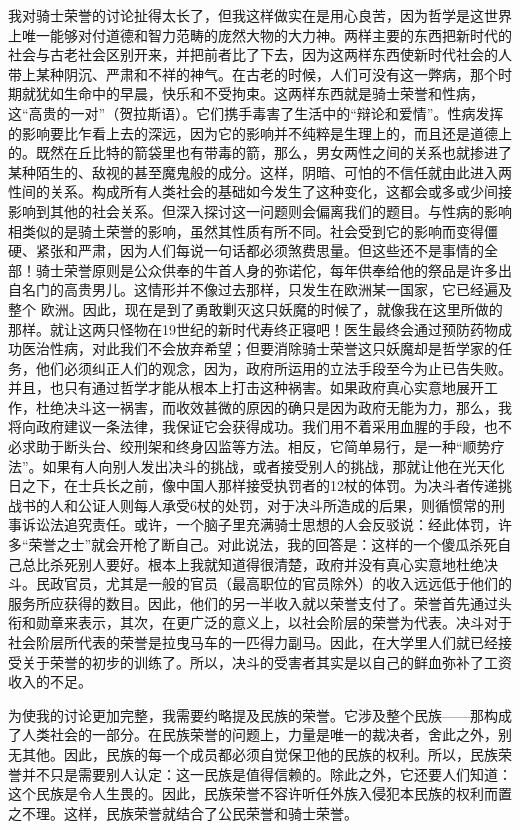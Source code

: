 \documentclass[12pt,oneside]{book}
\begin{document}
我对骑士荣誉的讨论扯得太长了，但我这样做实在是用心良苦，因为哲学是这世界上唯一能够对付道德和智力范畴的庞然大物的大力神。两样主要的东西把新时代的社会与古老社会区别开来，并把前者比了下去，因为这两样东西使新时代社会的人带上某种阴沉、严肃和不祥的神气。在古老的时候，人们可没有这一弊病，那个时期就犹如生命中的早晨，快乐和不受拘束。这两样东西就是骑士荣誉和性病，这“高贵的一对”（贺拉斯语）。它们携手毒害了生活中的“辩论和爱情”。性病发挥的影响要比乍看上去的深远，因为它的影响并不纯粹是生理上的，而且还是道德上的。既然在丘比特的箭袋里也有带毒的箭，那么，男女两性之间的关系也就掺进了某种陌生的、敌视的甚至魔鬼般的成分。这样，阴暗、可怕的不信任就由此进入两性间的关系。构成所有人类社会的基础如今发生了这种变化，这都会或多或少间接影响到其他的社会关系。但深入探讨这一问题则会偏离我们的题目。与性病的影响相类似的是骑土荣誉的影响，虽然其性质有所不同。社会受到它的影响而变得僵硬、紧张和严肃，因为人们每说一句话都必须煞费思量。但这些还不是事情的全部！骑士荣誉原则是公众供奉的牛首人身的弥诺佗，每年供奉给他的祭品是许多出自名门的高贵男儿。这情形并不像过去那样，只发生在欧洲某一国家，它已经遍及整个
欧洲。因此，现在是到了勇敢剿灭这只妖魔的时候了，就像我在这里所做的那样。就让这两只怪物在19世纪的新时代寿终正寝吧！医生最终会通过预防药物成功医治性病，对此我们不会放弃希望；但要消除骑士荣誉这只妖魔却是哲学家的任务，他们必须纠正人们的观念，因为，政府所运用的立法手段至今为止已告失败。并且，也只有通过哲学才能从根本上打击这种祸害。如果政府真心实意地展开工作，杜绝决斗这一祸害，而收效甚微的原因的确只是因为政府无能为力，那么，我将向政府建议一条法律，我保证它会获得成功。我们用不着采用血腥的手段，也不必求助于断头台、绞刑架和终身囚监等方法。相反，它简单易行，是一种“顺势疗法”。如果有人向别人发出决斗的挑战，或者接受别人的挑战，那就让他在光天化日之下，在士兵长之前，像中国人那样接受执罚者的12杖的体罚。为决斗者传递挑战书的人和公证人则每人承受6杖的处罚，对于决斗所造成的后果，则循惯常的刑事诉讼法追究责任。或许，一个脑子里充满骑士思想的人会反驳说：经此体罚，许多“荣誉之士”就会开枪了断自己。对此说法，我的回答是：这样的一个傻瓜杀死自己总比杀死别人要好。根本上我就知道得很清楚，政府并没有真心实意地杜绝决斗。民政官员，尤其是一般的官员（最高职位的官员除外）的收入远远低于他们的服务所应获得的数目。因此，他们的另一半收入就以荣誉支付了。荣誉首先通过头衔和勋章来表示，其次，在更广泛的意义上，以社会阶层的荣誉为代表。决斗对于社会阶层所代表的荣誉是拉曳马车的一匹得力副马。因此，在大学里人们就已经接受关于荣誉的初步的训练了。所以，决斗的受害者其实是以自己的鲜血弥补了工资收入的不足。 

为使我的讨论更加完整，我需要约略提及民族的荣誉。它涉及整个民族——那构成了人类社会的一部分。在民族荣誉的问题上，力量是唯一的裁决者，舍此之外，别无其他。因此，民族的每一个成员都必须自觉保卫他的民族的权利。所以，民族荣誉并不只是需要别人认定：这一民族是值得信赖的。除此之外，它还要人们知道：这个民族是令人生畏的。因此，民族荣誉不容许听任外族入侵犯本民族的权利而置之不理。这样，民族荣誉就结合了公民荣誉和骑士荣誉。 
\end{document}
